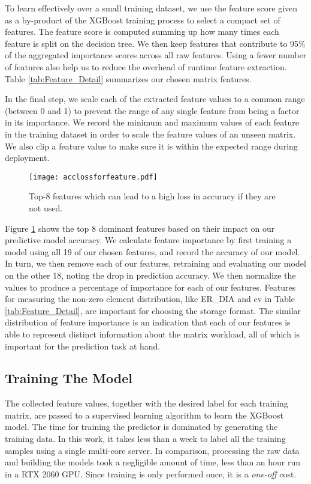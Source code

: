 To learn effectively over a small training dataset, we use the feature score given as a by-product of the XGBoost training process to  select a compact set of features. The feature score is computed summing up how many times each feature is split on the decision tree. We then keep features that contribute to 95\% of the aggregated importance scores across all raw features.
Using a fewer number of features also help us to reduce the overhead of
runtime feature extraction. Table \ref{tab:Feature_Detail} summarizes our chosen matrix features.

In the final step, we scale each of the extracted feature values to a common range (between 0 and 1) to prevent the range of any single
feature from being a factor in its importance. We record the minimum and maximum values of each feature in the training dataset in order to
scale the feature values of an unseen matrix. We also clip a feature value to make sure it is within the expected range during deployment.

\begin{figure}[t!]
\centering
\texttt{[image: acclossforfeature.pdf]}
\vspace{-4mm}
\caption{Top-8 features which can lead to a high loss
in accuracy if they are not used.}
\vspace{-5mm}
\label{fig:acclossforfeature}
\end{figure}

Figure \ref{fig:acclossforfeature} shows the top 8 dominant features based on their impact on our predictive model accuracy. We calculate
feature importance by first training a model using all 19 of our chosen features, and record the accuracy of our model. In turn, we then
remove each of our features, retraining and evaluating our model on the other 18, noting the drop in prediction accuracy. We then normalize
the values to produce a percentage of importance for each of our features. Features for measuring the non-zero element distribution, like
ER\_DIA and cv in Table \ref {tab:Feature_Detail}, are important for choosing the storage format. The similar distribution of feature importance is
an indication that each of our features is able to represent distinct information about the matrix workload, all of which is important for
the prediction task at hand.

\vspace{-3mm}
\subsection{Training The Model} \label{sec:tm}
\vspace{-2mm} The collected feature values, together with the desired label for each training matrix, are passed to a supervised learning
algorithm to learn the XGBoost model. The time for training the predictor is dominated by generating the training data. In this work, it
takes less than a week to label all the training samples using a single multi-core server.  In comparison, processing the raw data and
building the models took a negligible amount of time, less than an hour run in a RTX 2060 GPU. Since training is only performed once, it is
a \emph{one-off} cost.



